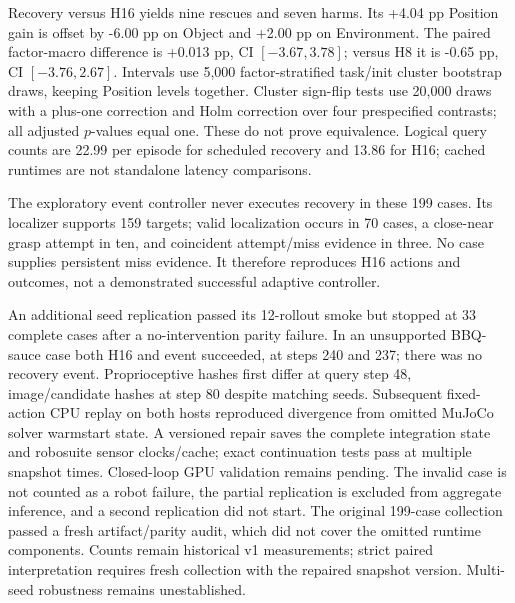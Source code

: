 \documentclass{article}
\begin{document}
\begin{table}[ht]
\caption{Completed broad evaluation. All factor entries and macro-SR are
percentages; Success counts all 199 cases. Scheduled recovery does not
improve the aggregate over H16.}
\centering\small
\end{table}

Recovery versus H16 yields nine rescues and seven harms. Its +4.04 pp
Position gain is offset by -6.00 pp on Object and +2.00 pp on Environment.
The paired factor-macro difference is +0.013 pp, CI $[-3.67,3.78]$;
versus H8 it is -0.65 pp, CI $[-3.76,2.67]$.
Intervals use 5,000 factor-stratified task/init cluster bootstrap draws,
keeping Position levels together. Cluster sign-flip tests use 20,000 draws
with a plus-one correction and Holm correction over four prespecified
contrasts; all adjusted $p$-values equal one. These do not prove equivalence.
Logical query counts are 22.99 per episode for scheduled recovery and
13.86 for H16; cached runtimes are not standalone latency comparisons.

The exploratory event controller never executes recovery in these 199 cases.
Its localizer supports 159 targets; valid localization occurs in 70 cases,
a close-near grasp attempt in ten, and coincident attempt/miss evidence in
three. No case supplies persistent miss evidence. It therefore reproduces
H16 actions and outcomes, not a demonstrated successful adaptive controller.

An additional seed replication passed its 12-rollout smoke but stopped at
33 complete cases after a no-intervention parity failure. In an unsupported
BBQ-sauce case both H16 and event succeeded, at steps 240 and 237; there was
no recovery event. Proprioceptive hashes first differ at query step 48,
image/candidate hashes at step 80 despite matching seeds. Subsequent fixed-action
CPU replay on both hosts reproduced divergence from omitted MuJoCo solver
warmstart state. A versioned repair saves the complete integration state and
robosuite sensor clocks/cache; exact continuation tests pass at multiple
snapshot times. Closed-loop GPU validation remains pending. The invalid case is not counted as a robot failure,
the partial replication is excluded from aggregate inference, and a second
replication did not start. The original 199-case collection passed a fresh
artifact/parity audit, which did not cover the omitted runtime components.
Counts remain historical v1 measurements; strict paired interpretation requires
fresh collection with the repaired snapshot version. Multi-seed robustness
remains unestablished.
\end{document}
